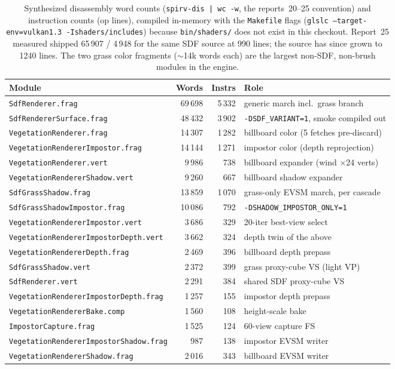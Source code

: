 \documentclass[11pt,a4paper]{article}
\begin{document}
\begin{table}[h]
\centering
\small
\begin{tabular}{@{}lrrl@{}}
\toprule
\textbf{Module} & \textbf{Words} & \textbf{Instrs} & \textbf{Role} \\
\midrule
\texttt{SdfRenderer.frag} & 69\,698 & 5\,332 & generic march incl.\ grass branch \\
\texttt{SdfRendererSurface.frag} & 48\,432 & 3\,902 & \texttt{-DSDF\_VARIANT=1}, smoke compiled out \\
\texttt{VegetationRenderer.frag} & 14\,307 & 1\,282 & billboard color (5 fetches pre-discard) \\
\texttt{VegetationRendererImpostor.frag} & 14\,144 & 1\,271 & impostor color (depth reprojection) \\
\texttt{VegetationRenderer.vert} & 9\,986 & 738 & billboard expander (wind $\times$24 verts) \\
\texttt{VegetationRendererShadow.vert} & 9\,260 & 667 & billboard shadow expander \\
\texttt{SdfGrassShadow.frag} & 13\,859 & 1\,070 & grass-only EVSM march, per cascade \\
\texttt{SdfGrassShadowImpostor.frag} & 10\,086 & 792 & \texttt{-DSHADOW\_IMPOSTOR\_ONLY=1} \\
\texttt{VegetationRendererImpostor.vert} & 3\,686 & 329 & 20-iter best-view select \\
\texttt{VegetationRendererImpostorDepth.vert} & 3\,662 & 324 & depth twin of the above \\
\texttt{VegetationRendererDepth.frag} & 2\,469 & 396 & billboard depth prepass \\
\texttt{SdfGrassShadow.vert} & 2\,372 & 399 & grass proxy-cube VS (light VP) \\
\texttt{SdfRenderer.vert} & 2\,291 & 384 & shared SDF proxy-cube VS \\
\texttt{VegetationRendererImpostorDepth.frag} & 1\,257 & 155 & impostor depth prepass \\
\texttt{VegetationRendererBake.comp} & 1\,560 & 108 & height-scale bake \\
\texttt{ImpostorCapture.frag} & 1\,525 & 124 & 60-view capture FS \\
\texttt{VegetationRendererImpostorShadow.frag} & 987 & 138 & impostor EVSM writer \\
\texttt{VegetationRendererShadow.frag} & 2\,016 & 343 & billboard EVSM writer \\
\bottomrule
\end{tabular}
\caption{Synthesized disassembly word counts (\texttt{spirv-dis | wc -w},
the reports~20--25 convention) and instruction counts (op lines), compiled
in-memory with the \texttt{Makefile} flags
(\texttt{glslc --target-env=vulkan1.3 -Ishaders/includes}) because
\texttt{bin/shaders/} does not exist in this checkout. Report~25 measured
shipped 65\,907 / 4\,948 for the same SDF source at 990 lines; the source
has since grown to 1240 lines. The two grass color fragments ($\sim$14k
words each) are the largest non-SDF, non-brush modules in the engine.}
\end{table}
\end{document}
